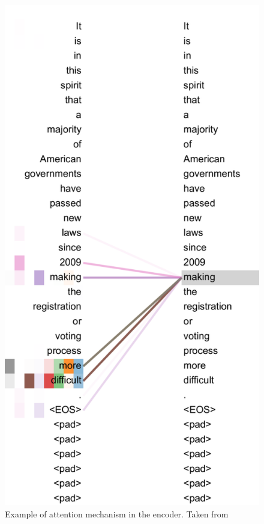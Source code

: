 \begin{figure}[H]
    \begin{minipage}{0.425\textwidth}
        \centering
        \includegraphics[width=\textwidth]{project/img/attention.png}
        \caption{Example of attention mechanism in the encoder. Taken from
}
\end{minipage}
\end{figure}
